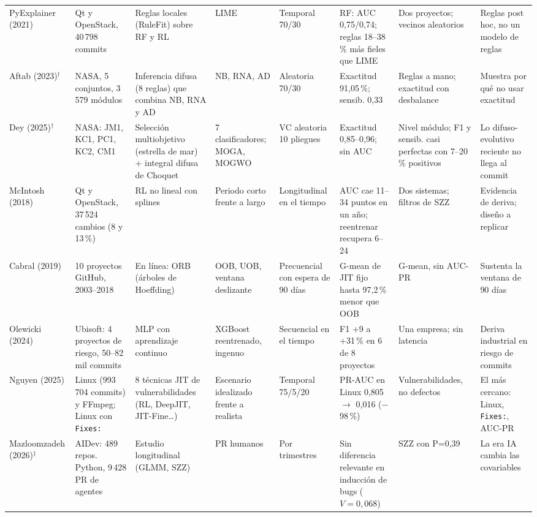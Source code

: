 \begin{table}[!t]
\begin{tabularx}{\textwidth}{@{}L{1.05cm}L{2.45cm}L{2.3cm}L{1.75cm}L{1.75cm}L{2.55cm}L{1.95cm}Y@{}}
 PyExplainer \cite{PyExplainer2021} (2021) & Qt y OpenStack, 40\,798 commits & Reglas locales (RuleFit) sobre RF y RL & LIME & Temporal 70/30 & RF: AUC 0,75/0,74; reglas 18--38\,\% más fieles que LIME & Dos proyectos; vecinos aleatorios & Reglas post hoc, no un modelo de reglas\\
 Aftab \cite{Aftab2023} (2023)$^\dagger$ & NASA, 5 conjuntos, 3\,579 módulos & Inferencia difusa (8 reglas) que combina NB, RNA y AD & NB, RNA, AD & Aleatoria 70/30 & Exactitud 91,05\,\%; sensib. 0,33 & Reglas a mano; exactitud con desbalance & Muestra por qué no usar exactitud\\
 Dey \cite{Dey2025} (2025)$^\dagger$ & NASA: JM1, KC1, PC1, KC2, CM1 & Selección multiobjetivo (estrella de mar) + integral difusa de Choquet & 7 clasificadores; MOGA, MOGWO & VC aleatoria 10 pliegues & Exactitud 0,85--0,96; sin AUC & Nivel módulo; F1 y sensib. casi perfectas con 7--20\,\% positivos & Lo difuso-evolutivo reciente no llega al commit\\
 McIntosh \cite{McIntosh2018} (2018) & Qt y OpenStack, 37\,524 cambios (8 y 13\,\%) & RL no lineal con splines & Periodo corto frente a largo & Longitudinal en el tiempo & AUC cae 11--34 puntos en un año; reentrenar recupera 6--24 & Dos sistemas; filtros de SZZ & Evidencia de deriva; diseño a replicar\\
 Cabral \cite{Cabral2019} (2019) & 10 proyectos GitHub, 2003--2018 & En línea: ORB (árboles de Hoeffding) & OOB, UOB, ventana deslizante & Precuencial con espera de 90 días & G-mean de JIT fijo hasta 97,2\,\% menor que OOB & G-mean, sin AUC-PR & Sustenta la ventana de 90 días\\
 Olewicki \cite{Olewicki2024} (2024) & Ubisoft: 4 proyectos de riesgo, 50--82 mil commits & MLP con aprendizaje continuo & XGBoost reentrenado, ingenuo & Secuencial en el tiempo & F1 +9 a +31\,\% en 6 de 8 proyectos & Una empresa; sin latencia & Deriva industrial en riesgo de commits\\
 Nguyen \cite{Nguyen2025} (2025) & Linux (993\,704 commits) y FFmpeg; Linux con \texttt{Fixes:} & 8 técnicas JIT de vulnerabilidades (RL, DeepJIT, JIT-Fine\ldots) & Escenario idealizado frente a realista & Temporal 75/5/20 & PR-AUC en Linux 0,805 $\rightarrow$ 0,016 ($-$98\,\%) & Vulnerabilidades, no defectos & El más cercano: Linux, \texttt{Fixes:}, AUC-PR\\
 Mazloomzadeh \cite{Mazloomzadeh2026} (2026)$^\ddagger$ & AIDev: 489 repos. Python, 9\,428 PR de agentes & Estudio longitudinal (GLMM, SZZ) & PR humanos & Por trimestres & Sin diferencia relevante en inducción de bugs ($V=0{,}068$) & SZZ con P=0,39 & La era IA cambia las covariables\\

\end{tabularx}
\end{table}
